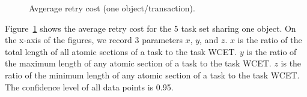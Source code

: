 \documentclass[prodmode,acmtecs]{acmsmall}
\begin{document}
\begin{compactenum}
\begin{figure}
\centering
{}
\caption{Avgerage retry cost (one object/transaction).}

\label{fig:pnf_results_uniobject}
\end{figure}

Figure~\ref{fig:pnf_results_uniobject} shows the average retry cost for the 5 task set sharing one object. On the x-axis of the figures, we record 3 parameters $x$, $y$, and $z$. $x$ is the ratio of the total length of all atomic sections of a task to the task WCET. $y$ is the ratio of the maximum length of any atomic section of a task to the task WCET. $z$ is the ratio of the minimum length of any atomic section of a task to the task WCET. The confidence level of all data points is 0.95.
 

\end{compactenum}
\end{document}
